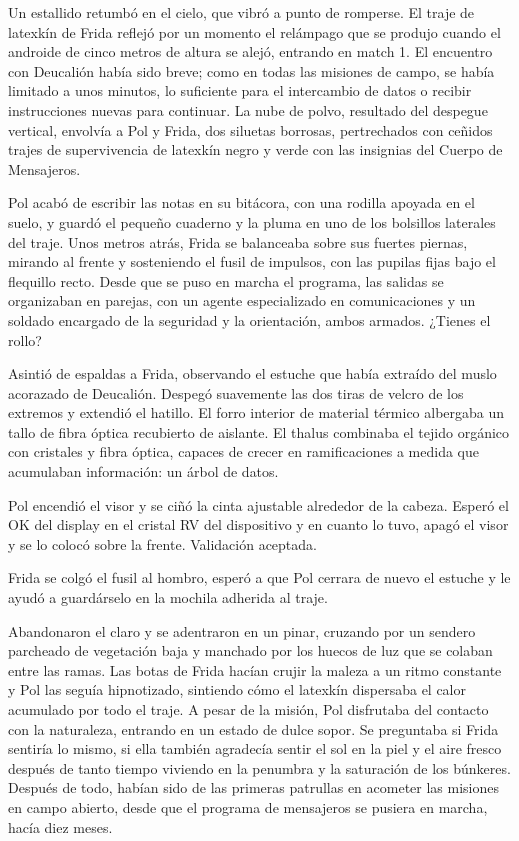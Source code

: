 Un estallido retumbó en el cielo, que vibró a punto de romperse. El traje de latexkín de Frida reflejó por un momento el relámpago que se produjo cuando el androide de cinco metros de altura se alejó, entrando en match 1. El encuentro con Deucalión había sido breve; como en todas las misiones de campo, se había limitado a unos minutos, lo suficiente para el intercambio de datos o recibir instrucciones nuevas para continuar. La nube de polvo, resultado del despegue vertical, envolvía a Pol y Frida, dos siluetas borrosas, pertrechados con ceñidos trajes de supervivencia de latexkín negro y verde con las insignias del Cuerpo de Mensajeros. 

Pol acabó de escribir las notas en su bitácora, con una rodilla apoyada en el suelo, y guardó el pequeño cuaderno y la pluma en uno de los bolsillos laterales del traje. Unos metros atrás, Frida se balanceaba sobre sus fuertes piernas, mirando al frente y sosteniendo el fusil de impulsos, con las pupilas fijas bajo el flequillo recto. Desde que se puso en marcha el programa, las salidas se organizaban en parejas, con un agente especializado en comunicaciones y un soldado encargado de la seguridad y la orientación, ambos armados. 
\reply ¿Tienes el rollo?

Asintió de espaldas a Frida, observando el estuche que había extraído del muslo acorazado de Deucalión. Despegó suavemente las dos tiras de velcro de los extremos y extendió el hatillo. El forro interior de material térmico albergaba un tallo de fibra óptica recubierto de aislante. El thalus combinaba el tejido orgánico con cristales y fibra óptica, capaces de crecer en ramificaciones a medida que acumulaban información: un árbol de datos. 

Pol encendió el visor y se ciñó la cinta ajustable alrededor de la cabeza. Esperó el OK del display en el cristal RV del dispositivo y en cuanto lo tuvo, apagó el visor y se lo colocó sobre la frente.
\reply Validación aceptada.
 
Frida se colgó el fusil al hombro, esperó a que Pol cerrara de nuevo el estuche y le ayudó a guardárselo en la mochila adherida al traje.

Abandonaron el claro y se adentraron en un pinar, cruzando por un sendero parcheado de vegetación baja y manchado por los huecos de luz que se colaban entre las ramas. Las botas de Frida hacían crujir la maleza a un ritmo constante y Pol las seguía hipnotizado, sintiendo cómo el latexkín dispersaba el calor acumulado por todo el traje. A pesar de la misión, Pol disfrutaba del contacto con la naturaleza, entrando en un estado de dulce sopor. Se preguntaba si Frida sentiría lo mismo, si ella también agradecía sentir el sol en la piel y el aire fresco después de tanto tiempo viviendo en la penumbra y la saturación de los búnkeres. Después de todo, habían sido de las primeras patrullas en acometer las misiones en campo abierto, desde que el programa de mensajeros se pusiera en marcha, hacía diez meses. 


